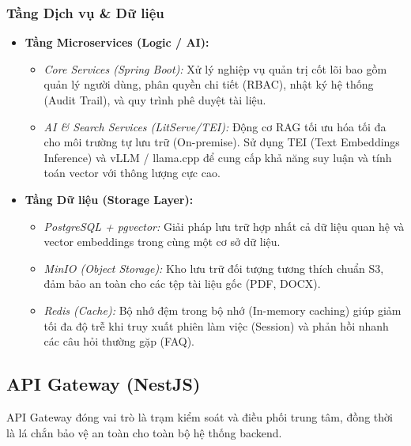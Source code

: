 \documentclass[12pt,a4paper]{report}
\begin{document}
\subsubsection{Tầng Dịch vụ \& Dữ liệu}
\begin{itemize}
    \item \textbf{Tầng Microservices (Logic / AI):}
    \begin{itemize}
        \item \textit{Core Services (Spring Boot):} Xử lý nghiệp vụ quản trị cốt lõi bao gồm quản lý người dùng, phân quyền chi tiết (RBAC), nhật ký hệ thống (Audit Trail), và quy trình phê duyệt tài liệu.
        \item \textit{AI \& Search Services (LitServe/TEI):} Động cơ RAG tối ưu hóa tối đa cho môi trường tự lưu trữ (On-premise). Sử dụng TEI (Text Embeddings Inference) và vLLM / llama.cpp để cung cấp khả năng suy luận và tính toán vector với thông lượng cực cao.
    \end{itemize}
    \item \textbf{Tầng Dữ liệu (Storage Layer):}
    \begin{itemize}
        \item \textit{PostgreSQL + pgvector:} Giải pháp lưu trữ hợp nhất cả dữ liệu quan hệ và vector embeddings trong cùng một cơ sở dữ liệu.
        \item \textit{MinIO (Object Storage):} Kho lưu trữ đối tượng tương thích chuẩn S3, đảm bảo an toàn cho các tệp tài liệu gốc (PDF, DOCX).
        \item \textit{Redis (Cache):} Bộ nhớ đệm trong bộ nhớ (In-memory caching) giúp giảm tối đa độ trễ khi truy xuất phiên làm việc (Session) và phản hồi nhanh các câu hỏi thường gặp (FAQ).
    \end{itemize}
\end{itemize}

\subsection{API Gateway (NestJS)}
API Gateway đóng vai trò là trạm kiểm soát và điều phối trung tâm, đồng thời là lá chắn bảo vệ an toàn cho toàn bộ hệ thống backend.
\end{document}
